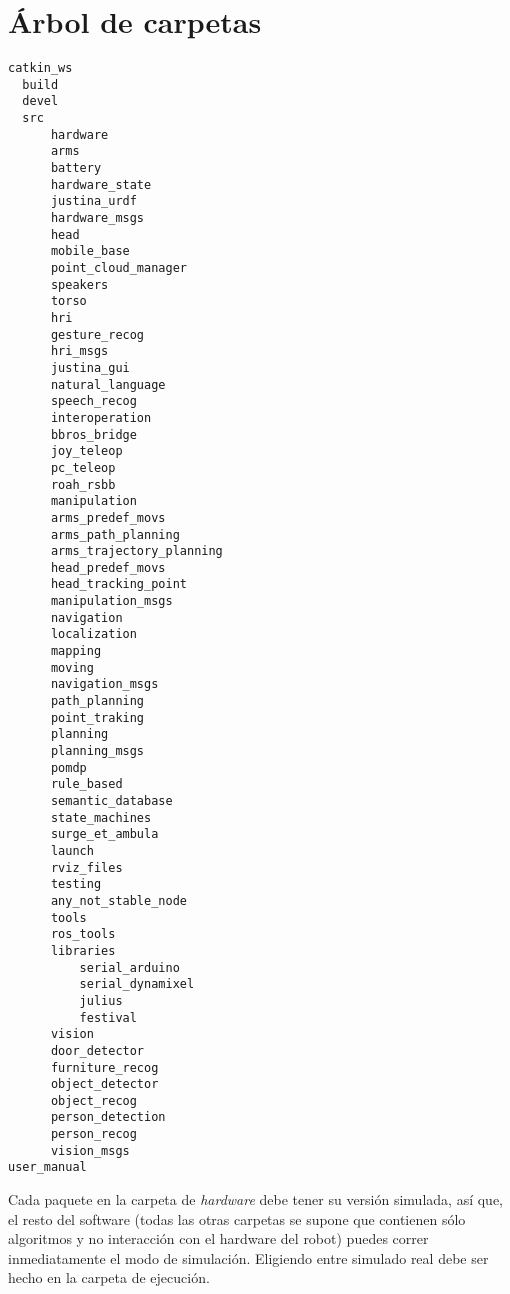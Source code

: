 \documentclass[user_manual.tex]{subfiles}
\begin{document}
\section{Árbol de carpetas}
\begin{verbatim}
catkin_ws
  build
  devel
  src
      hardware
	  arms
	  battery
	  hardware_state
	  justina_urdf
	  hardware_msgs
	  head
	  mobile_base
	  point_cloud_manager
	  speakers
	  torso
      hri
	  gesture_recog
	  hri_msgs
	  justina_gui
	  natural_language
	  speech_recog
      interoperation
	  bbros_bridge
	  joy_teleop
	  pc_teleop
	  roah_rsbb
      manipulation
	  arms_predef_movs
	  arms_path_planning
	  arms_trajectory_planning
	  head_predef_movs
	  head_tracking_point
	  manipulation_msgs
      navigation
	  localization
	  mapping
	  moving
	  navigation_msgs
	  path_planning
	  point_traking
      planning
	  planning_msgs
	  pomdp
	  rule_based
	  semantic_database
	  state_machines
      surge_et_ambula
	  launch
	  rviz_files
      testing
	  any_not_stable_node
      tools
	  ros_tools
	  libraries
	      serial_arduino
	      serial_dynamixel
	      julius
	      festival
      vision
	  door_detector
	  furniture_recog
	  object_detector
	  object_recog
	  person_detection
	  person_recog
	  vision_msgs
user_manual
\end{verbatim}
Cada paquete en la carpeta de \textit{hardware} debe tener su versión simulada, así que, el resto del 
software (todas las otras carpetas se supone que contienen sólo algoritmos y no interacción con el 
hardware del robot) puedes correr inmediatamente el modo de simulación. Eligiendo entre simulado  
real debe ser hecho en la carpeta de ejecución.
\end{document}
